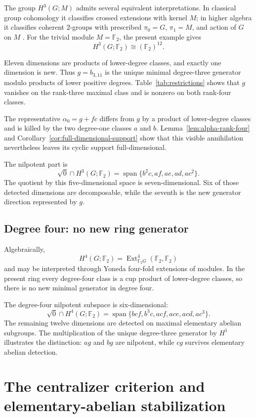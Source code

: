 \documentclass[11pt]{amsart}
\theoremstyle{definition}
\theoremstyle{remark}
\DeclareMathOperator{\Span}{span}
\DeclareMathOperator{\Ext}{Ext}
\newcommand{\F}{\mathbb F}
\newcommand{\Nrad}{\sqrt{0}}
\begin{document}
The group \(H^3(G;M)\) admits several equivalent interpretations.  In classical group cohomology it classifies crossed extensions with kernel \(M\); in higher algebra it classifies coherent \(2\)-groups with prescribed \(\pi_0=G\), \(\pi_1=M\), and action of \(G\) on \(M\) \cite{Huebschmann1980,BaezLauda2004}.  For the trivial module \(M=\F_2\), the present example gives
\[
H^3(G;\F_2)\cong(\F_2)^{12}.
\]

Eleven dimensions are products of lower-degree classes, and exactly one dimension is new.  Thus \(g=b_{3,11}\) is the unique minimal degree-three generator modulo products of lower positive degrees.  Table~\ref{tab:restrictions} shows that \(g\) vanishes on the rank-three maximal class and is nonzero on both rank-four classes.

The representative $\alpha_0=g+fc$ differs from $g$ by a product of lower-degree classes and is killed by the two degree-one classes $a$ and $b$.  Lemma~\ref{lem:alpha-rank-four} and Corollary~\ref{cor:full-dimensional-support} show that this visible annihilation nevertheless leaves its cyclic support full-dimensional.

The nilpotent part is
\[
\Nrad\cap H^3(G;\F_2)
=\Span\{b^2c,af,ae,ad,ac^2\}.
\]
The quotient by this five-dimensional space is seven-dimensional.  Six of those detected dimensions are decomposable, while the seventh is the new generator direction represented by \(g\).

\subsection{Degree four: no new ring generator}

Algebraically,
\[
H^4(G;\F_2)=\Ext^4_{\F_2G}(\F_2,\F_2)
\]
and may be interpreted through Yoneda four-fold extensions of modules.  In the present ring every degree-four class is a cup product of lower-degree classes, so there is no new minimal generator in degree four.

The degree-four nilpotent subspace is six-dimensional:
\[
\Nrad\cap H^4(G;\F_2)
=\Span\{bcf,b^3c,acf,ace,acd,ac^3\}.
\]
The remaining twelve dimensions are detected on maximal elementary abelian subgroups.  The multiplication of the unique degree-three generator by \(H^1\) illustrates the distinction: \(ag\) and \(bg\) are nilpotent, while \(cg\) survives elementary abelian detection.


\section{The centralizer criterion and elementary-abelian stabilization}
\label{sec:stabilization}
\end{document}
